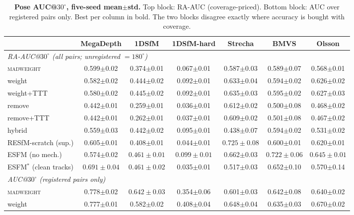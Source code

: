 \documentclass[10pt,twocolumn,letterpaper]{article}
\newcommand{\mad}{\textsc{madweight}}
\begin{document}
\begin{table}[h]\centering\scriptsize
\setlength{\tabcolsep}{3pt}
\caption{\textbf{Pose AUC@$30^{\circ}$, five-seed mean$\pm$std.} Top block: RA-AUC
(coverage-priced). Bottom block: AUC over registered pairs only. Best per column in
bold. The two blocks disagree exactly where accuracy is bought with coverage.}
\label{tab:raauc}
\begin{tabular}{@{}lcccccc@{}}
\toprule
 & MegaDepth & 1DSfM & 1DSfM-hard & Strecha & BMVS & Olsson\\
\midrule
\multicolumn{7}{l}{\emph{RA-AUC@$30^{\circ}$ (all pairs; unregistered $=180^{\circ}$)}}\\[1pt]
\mad{}       & 0.599$\pm$0.02 & 0.374$\pm$0.01 & 0.067$\pm$0.01 & 0.587$\pm$0.03 & 0.589$\pm$0.07 & 0.568$\pm$0.01\\
weight       & 0.582$\pm$0.02 & 0.444$\pm$0.02 & 0.092$\pm$0.01 & 0.633$\pm$0.04 & 0.594$\pm$0.02 & 0.626$\pm$0.02\\
weight+TTT   & 0.580$\pm$0.02 & 0.445$\pm$0.02 & 0.092$\pm$0.01 & 0.635$\pm$0.03 & 0.595$\pm$0.02 & 0.627$\pm$0.03\\
remove       & 0.442$\pm$0.01 & 0.259$\pm$0.01 & 0.036$\pm$0.01 & 0.612$\pm$0.02 & 0.500$\pm$0.08 & 0.468$\pm$0.02\\
remove+TTT   & 0.442$\pm$0.01 & 0.262$\pm$0.01 & 0.037$\pm$0.01 & 0.609$\pm$0.02 & 0.501$\pm$0.08 & 0.467$\pm$0.02\\
hybrid       & 0.559$\pm$0.03 & 0.442$\pm$0.02 & 0.095$\pm$0.01 & 0.438$\pm$0.07 & 0.594$\pm$0.02 & 0.531$\pm$0.02\\
RESfM-scratch (sup.) & 0.605$\pm$0.01 & 0.408$\pm$0.01 & 0.044$\pm$0.01 & $\mathbf{0.725\pm0.08}$ & 0.600$\pm$0.01 & 0.620$\pm$0.01\\
ESFM (no mech.) & 0.574$\pm$0.02 & $\mathbf{0.461\pm0.01}$ & $\mathbf{0.099\pm0.01}$ & 0.662$\pm$0.03 & $\mathbf{0.722\pm0.06}$ & $\mathbf{0.645\pm0.01}$\\
ESFM$^{\ast}$ (clean tracks) & $\mathbf{0.691\pm0.04}$ & $\mathbf{0.461\pm0.02}$ & 0.035$\pm$0.01 & 0.517$\pm$0.03 & 0.652$\pm$0.10 & 0.570$\pm$0.14\\
\midrule
\multicolumn{7}{l}{\emph{AUC@$30^{\circ}$ (registered pairs only)}}\\[1pt]
\mad{}       & 0.778$\pm$0.02 & $\mathbf{0.642\pm0.03}$ & 0.354$\pm$0.06 & 0.601$\pm$0.03 & 0.642$\pm$0.08 & 0.640$\pm$0.02\\
weight       & 0.777$\pm$0.01 & 0.582$\pm$0.02 & 0.408$\pm$0.04 & 0.648$\pm$0.04 & 0.635$\pm$0.03 & 0.670$\pm$0.02\\

\end{tabular}
\end{table}
\end{document}
